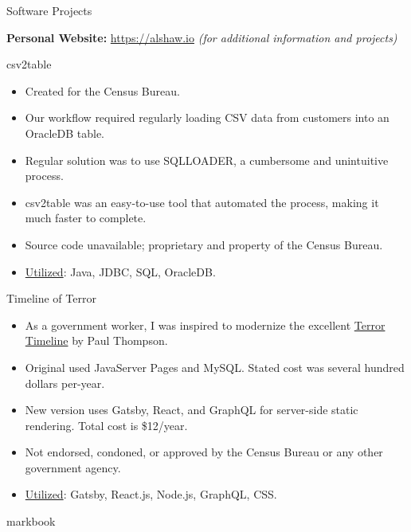\documentclass{mcdowellcv}
\begin{document}
    \begin{cvsection}{Software Projects}
        \begin{cvsubsectiontext}{\textbf{Personal Website:} \url{https://alshaw.io} \textit{(for additional information and projects)}}
    \end{cvsubsectiontext}
          
        \begin{cvsubsection}{csv2table}{}{}
      \begin{itemize}
                \item Created for the Census Bureau.
                \item Our workflow required regularly loading CSV data from customers into an
OracleDB table.
                \item Regular solution was to use SQLLOADER, a cumbersome and unintuitive
process.
                \item csv2table was an easy-to-use tool that automated the process, making it
much faster to complete.
                \item Source code unavailable; proprietary and property of the Census Bureau.
                \item \underline{Utilized}: Java, JDBC, SQL, OracleDB.
              \end{itemize}
    \end{cvsubsection}
        \begin{cvsubsection}{Timeline of Terror}{}{}
      \begin{itemize}
                \item As a government worker, I was inspired to modernize the excellent
\href{https://en.wikipedia.org/wiki/The_Terror_Timeline}{Terror Timeline}
by Paul Thompson.
                \item Original used JavaServer Pages and MySQL. Stated cost was several
hundred dollars per-year.
                \item New version uses Gatsby, React, and GraphQL for server-side static
rendering. Total cost is \$12/year.
                \item Not endorsed, condoned, or approved by the Census Bureau or any other
government agency.
                \item \underline{Utilized}: Gatsby, React.js, Node.js, GraphQL, CSS.
              \end{itemize}
    \end{cvsubsection}
        \begin{cvsubsection}{markbook}{}{}

\end{cvsubsection}
\end{cvsection}
\end{document}
